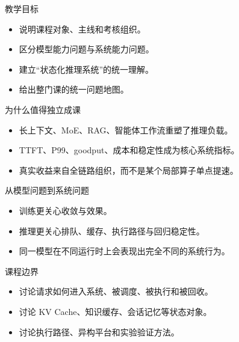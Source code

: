 




\begin{frame}[plain]
  \titlepage
\end{frame}

\begin{frame}{教学目标}
  \begin{itemize}
    \item 说明课程对象、主线和考核组织。
    \item 区分模型能力问题与系统能力问题。
    \item 建立“状态化推理系统”的统一理解。
    \item 给出整门课的统一问题地图。
  \end{itemize}
\end{frame}

\begin{frame}{为什么值得独立成课}
  \begin{itemize}
    \item 长上下文、MoE、RAG、智能体工作流重塑了推理负载。
    \item TTFT、P99、goodput、成本和稳定性成为核心系统指标。
    \item 真实收益来自全链路组织，而不是某个局部算子单点提速。
  \end{itemize}
\end{frame}

\begin{frame}{从模型问题到系统问题}
  \begin{itemize}
    \item 训练更关心收敛与效果。
    \item 推理更关心排队、缓存、执行路径与回归稳定性。
    \item 同一模型在不同运行时上会表现出完全不同的系统行为。
  \end{itemize}
\end{frame}

\begin{frame}{课程边界}
  \begin{itemize}
    \item 讨论请求如何进入系统、被调度、被执行和被回收。
    \item 讨论 KV Cache、知识缓存、会话记忆等状态对象。
    \item 讨论执行路径、异构平台和实验验证方法。
  \end{itemize}
\end{frame}

